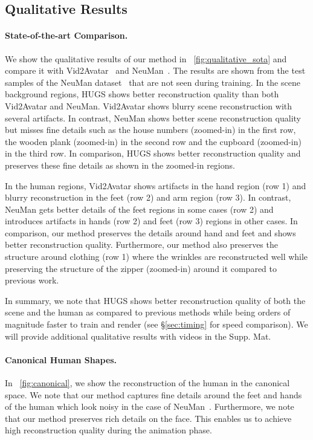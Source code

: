 \subsection{Qualitative Results}
\label{sec:qualitative}
\paragraph{State-of-the-art Comparison.} We show the qualitative results of our method in ~\cref{fig:qualitative_sota} and compare it with Vid2Avatar~\cite{guo2023vid2avatar} and NeuMan~\cite{jiang2022neuman}. The results are shown from the test samples of the NeuMan dataset~\cite{jiang2022neuman} that are not seen during training.
In the scene background regions, HUGS shows better reconstruction quality than both Vid2Avatar and NeuMan. Vid2Avatar shows blurry scene reconstruction with several artifacts. In contrast, NeuMan shows better scene reconstruction quality but misses fine details such as the house numbers (zoomed-in) in the first row, the wooden plank (zoomed-in) in the second row and the cupboard (zoomed-in) in the third row. In comparison, HUGS shows better reconstruction quality and preserves these fine details as shown in the zoomed-in regions.

In the human regions, Vid2Avatar shows artifacts in the hand region (row 1) and blurry reconstruction in the feet (row 2) and arm region (row 3). In contrast, NeuMan gets better details of the feet regions in some cases (row 2) and introduces artifacts in hands (row 2) and feet (row 3) regions in other cases. In comparison, our method preserves the details around hand and feet and shows better reconstruction quality. Furthermore, our method also preserves the structure around clothing (row 1) where the wrinkles are reconstructed well while preserving the structure of the zipper (zoomed-in) around it compared to previous work.

In summary, we note that HUGS shows better reconstruction quality of both the scene and the human as compared to previous methods while being orders of magnitude faster to train and render (see \S \ref{sec:timing} for speed comparison). We will provide additional qualitative results with videos in the Supp. Mat.


\paragraph{Canonical Human Shapes.} In ~\cref{fig:canonical}, we show the reconstruction of the human in the canonical space. We note that our method captures fine details around the feet and hands of the human which look noisy in the case of NeuMan~\cite{jiang2022neuman}. Furthermore, we note that our method preserves rich details on the face. This enables us to achieve high reconstruction quality during the animation phase. 

